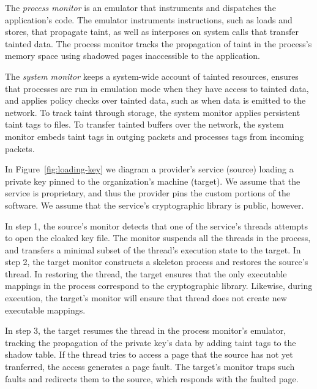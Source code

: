 The \emph{process monitor} is an emulator that instruments and dispatches the
application's code.
%
The emulator instruments instructions, such as
loads and stores, that propagate taint, as well as interposes on
system calls that transfer tainted data.
%
The process monitor tracks the propagation of taint in the process's
memory space using shadowed pages inaccessible to the application.


The \emph{system monitor} keeps a system-wide account of tainted resources,
ensures that processes are run in emulation mode when they have access to
tainted data, and applies policy checks over tainted data, such as when data is
emitted to the network.
%
To track taint through storage, the system monitor applies persistent
taint tags to files.
%
To transfer tainted buffers over the network, the system monitor embeds taint
tags in outging packets and processes tags from incoming packets.





%
In Figure~\ref{fig:loading-key} we diagram a provider's service (source) loading
a private key pinned to the organization's machine (target).
%
We assume that the service is proprietary, and thus the provider
pins the custom portions of the software.
%
We assume that the service's cryptographic library is public, however.


In step 1, the source's monitor detects that one of the service's threads
attempts to open the cloaked key file.
%
The monitor suspends all the threads in the process, and transfers a minimal
subset of the thread's execution state to the target.
%
In step 2, the target monitor constructs a skeleton process and
restores the source's thread.
%
In restoring the thread, the target ensures that the only executable mappings
in the process correspond to the cryptographic library.
%
Likewise, during execution, the target's monitor will ensure that thread does
not create new executable mappings.


In step 3, the target resumes the thread in the process monitor's emulator,
tracking the propagation of the private key's data by adding taint tags to
the shadow table.
%
If the thread tries to access a page that the source has not yet tranferred,
the access generates a page fault.
%
The target's monitor traps such faults and redirects them to the source, which
responds with the faulted page.



